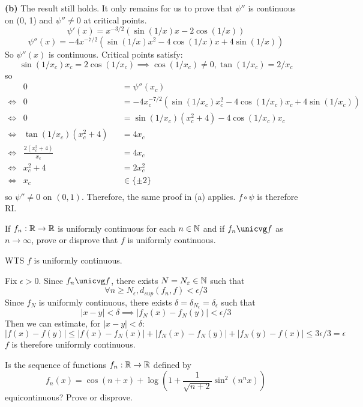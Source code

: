 \documentclass[a4paper, 12pt]{article}
\begin{document}
\textbf{(b)} The result still holds. It only remains for us to prove that $\psi''$ is continuous on (0, 1) and $\psi'' \neq 0$ at critical points.
\[
\psi'(x) = x^{-3/2}(\sin(1/x)x - 2\cos(1/x))
\]
\[
\psi''(x) = -4x^{-7/2}(\sin(1/x)x^2 -4\cos(1/x)x + 4\sin(1/x))
\]
So $\psi''(x)$ is continuous. Critical points satisfy:
\[
\sin(1/x_c)x_c = 2\cos(1/x_c) \implies \cos(1/x_c) \neq 0, \tan(1/x_c) = 2/x_c
\]
so 
\[
    \begin{aligned}
        &0 &&= \psi''(x_c) \\
        \Leftrightarrow &0 &&= -4x_c^{-7/2}(\sin(1/x_c)x_c^2 -4\cos(1/x_c)x_c + 4\sin(1/x_c))\\
        \Leftrightarrow &0 &&= \sin(1/x_c)(x_c^2 + 4) - 4\cos(1/x_c)x_c \\
        \Leftrightarrow &\tan(1/x_c)(x_c^2 + 4) &&= 4x_c \\
        \Leftrightarrow & \frac{2(x_c^2 + 4)}{x_c} &&=4x_c \\
        \Leftrightarrow & x_c^2 + 4 &&= 2x_c^2 \\
        \Leftrightarrow & x_c && \in \{\pm 2\} \\
    \end{aligned}
\]
so $\psi'' \neq 0$ on $(0, 1)$. Therefore, the same proof in (a) applies. $f \circ \psi$ is therefore RI.
\begin{problem} 
If $f_n: \mathbb{R} \to \mathbb{R}$ is uniformly continuous for each $n \in \mathbb{N}$ and if $f_n \unicvg f$ as $n \to \infty$, prove or disprove that $f$ is uniformly continuous.
\end{problem}
\begin{solution}
    WTS $f$ is uniformly continuous.

    Fix $\epsilon > 0$. Since $f_n \unicvg f$, there exists $N =  N_\varepsilon \in \mathbb{N}$ such that \[
        \forall n \geq N_\epsilon, d_{sup}(f_n, f) < \epsilon /3
    \]
    Since $f_N$ is uniformly continuous, there exists $\delta = \delta_{N_\epsilon} = \delta_\epsilon$ such that \[
        |x - y| < \delta \implies |f_N(x) - f_N(y)| <
        \epsilon / 3
    \]
    Then we can estimate, for $|x - y| < \delta$:
    \[
        |f(x) - f(y)| \leq |f(x) - f_N(x)| + |f_N(x) - f_N(y) | + |f_N(y) - f(x) | \leq 3 \epsilon /3 = \epsilon
    \]
    $f$ is therefore uniformly continuous.
\end{solution}
\begin{problem} 
Is the sequence of functions $f_n: \mathbb{R} \to \mathbb{R}$ defined by \[
    f_n(x) = \cos(n+ x) + \log \left(1 + \frac{1}{\sqrt{n+2}} \sin^2(n^nx)\right)
\]
equicontinuous? Prove or disprove.
\end{problem}
\end{document}
